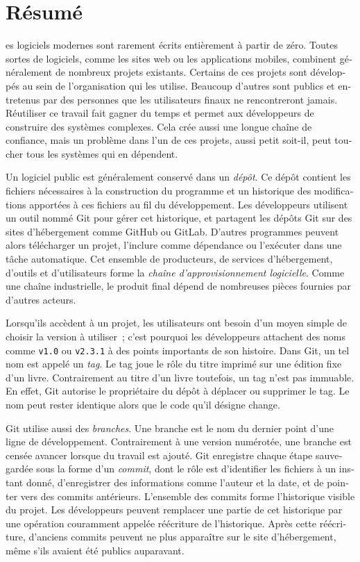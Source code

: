 \chapter*{Résumé}
\begin{otherlanguage}{french}
\begin{SingleSpace}
es logiciels modernes sont rarement écrits entièrement à partir de zéro.
Toutes sortes de logiciels, comme les sites web ou les applications mobiles, combinent généralement de nombreux projets existants.
Certains de ces projets sont développés au sein de l'organisation qui les utilise.
Beaucoup d'autres sont publics et entretenus par des personnes que les utilisateurs finaux ne rencontreront jamais.
Réutiliser ce travail fait gagner du temps et permet aux développeurs de construire des systèmes complexes.
Cela crée aussi une longue chaîne de confiance, mais un problème dans l'un de ces projets, aussi petit soit-il, peut toucher tous les systèmes qui en dépendent.

Un logiciel public est généralement conservé dans un \emph{dépôt}.
Ce dépôt contient les fichiers nécessaires à la construction du programme et un historique des modifications apportées à ces fichiers au fil du développement.
Les développeurs utilisent un outil nommé Git pour gérer cet historique, et partagent les dépôts Git sur des sites d'hébergement comme GitHub ou GitLab.
D'autres programmes peuvent alors télécharger un projet, l'inclure comme dépendance ou l'exécuter dans une tâche automatique.
Cet ensemble de producteurs, de services d'hébergement, d'outils et d'utilisateurs forme la \emph{chaîne d'approvisionnement logicielle}.
Comme une chaîne industrielle, le produit final dépend de nombreuses pièces fournies par d'autres acteurs.

Lorsqu'ils accèdent à un projet, les utilisateurs ont besoin d'un moyen simple de choisir la version à utiliser~; c'est pourquoi les développeurs attachent des noms comme \texttt{v1.0} ou \texttt{v2.3.1} à des points importants de son histoire.
Dans Git, un tel nom est appelé un \emph{tag}.
Le tag joue le rôle du titre imprimé sur une édition fixe d'un livre.
Contrairement au titre d'un livre toutefois, un tag n'est pas immuable.
En effet, Git autorise le propriétaire du dépôt à déplacer ou supprimer le tag.
Le nom peut rester identique alors que le code qu'il désigne change.

Git utilise aussi des \emph{branches}.
Une branche est le nom du dernier point d'une ligne de développement.
Contrairement à une version numérotée, une branche est censée avancer lorsque du travail est ajouté.
Git enregistre chaque étape sauvegardée sous la forme d'un \emph{commit}, dont le rôle est d'identifier les fichiers à un instant donné, d'enregistrer des informations comme l'auteur et la date, et de pointer vers des commits antérieurs.
L'ensemble des commits forme l'historique visible du projet.
Les développeurs peuvent remplacer une partie de cet historique par une opération couramment appelée réécriture de l'historique.
Après cette réécriture, d'anciens commits peuvent ne plus apparaître sur le site d'hébergement, même s'ils avaient été publics auparavant.


\end{SingleSpace}
\end{otherlanguage}
